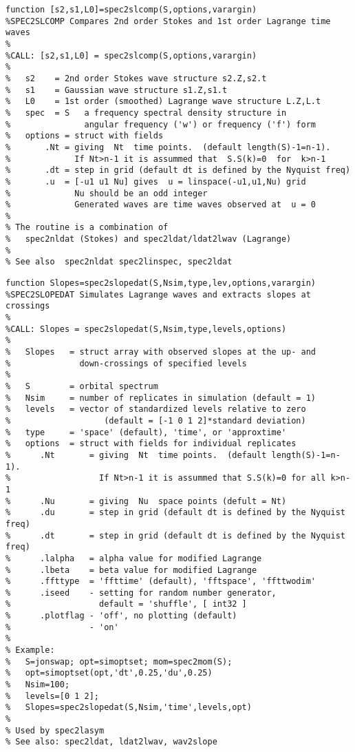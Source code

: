{\begin{verbatim}
function [s2,s1,L0]=spec2slcomp(S,options,varargin)
%SPEC2SLCOMP Compares 2nd order Stokes and 1st order Lagrange time waves 
%           
%CALL: [s2,s1,L0] = spec2slcomp(S,options,varargin)
% 
%   s2    = 2nd order Stokes wave structure s2.Z,s2.t
%   s1    = Gaussian wave structure s1.Z,s1.t
%   L0    = 1st order (smoothed) Lagrange wave structure L.Z,L.t 
%   spec  = S   a frequency spectral density structure in 
%               angular frequency ('w') or frequency ('f') form 
%   options = struct with fields 
%       .Nt = giving  Nt  time points.  (default length(S)-1=n-1).
%             If Nt>n-1 it is assummed that  S.S(k)=0  for  k>n-1
%       .dt = step in grid (default dt is defined by the Nyquist freq) 
%       .u  = [-u1 u1 Nu] gives  u = linspace(-u1,u1,Nu) grid
%             Nu should be an odd integer
%             Generated waves are time waves observed at  u = 0  
%  
% The routine is a combination of 
%   spec2nldat (Stokes) and spec2ldat/ldat2lwav (Lagrange)
%
% See also  spec2nldat spec2linspec, spec2ldat
\end{verbatim}
\clearpage

\begin{verbatim}
function Slopes=spec2slopedat(S,Nsim,type,lev,options,varargin)
%SPEC2SLOPEDAT Simulates Lagrange waves and extracts slopes at crossings 
%
%CALL: Slopes = spec2slopedat(S,Nsim,type,levels,options)
%
%   Slopes   = struct array with observed slopes at the up- and 
%              down-crossings of specified levels
%
%   S        = orbital spectrum
%   Nsim     = number of replicates in simulation (default = 1)
%   levels   = vector of standardized levels relative to zero 
%                   (default = [-1 0 1 2]*standard deviation)
%   type     = 'space' (default), 'time', or 'approxtime'
%   options  = struct with fields for individual replicates
%      .Nt       = giving  Nt  time points.  (default length(S)-1=n-1).
%                  If Nt>n-1 it is assummed that S.S(k)=0 for all k>n-1
%      .Nu       = giving  Nu  space points (defult = Nt)
%      .du       = step in grid (default dt is defined by the Nyquist freq)
%      .dt       = step in grid (default dt is defined by the Nyquist freq) 
%      .lalpha   = alpha value for modified Lagrange
%      .lbeta    = beta value for modified Lagrange
%      .ffttype  = 'ffttime' (default), 'fftspace', 'ffttwodim'
%      .iseed    - setting for random number generator,  
%                  default = 'shuffle', [ int32 ]
%      .plotflag - 'off', no plotting (default)
%                - 'on' 
%
% Example:
%   S=jonswap; opt=simoptset; mom=spec2mom(S);
%   opt=simoptset(opt,'dt',0.25,'du',0.25)
%   Nsim=100;
%   levels=[0 1 2];
%   Slopes=spec2slopedat(S,Nsim,'time',levels,opt)
%
% Used by spec2lasym
% See also: spec2ldat, ldat2lwav, wav2slope
\end{verbatim}
\clearpage

}
